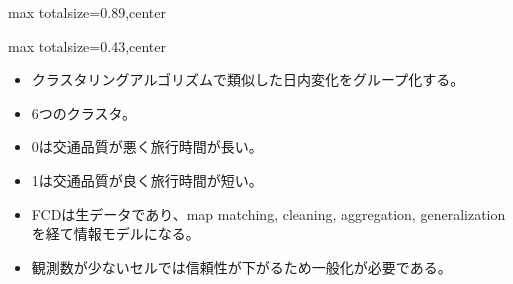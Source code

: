 \begin{minipage}[t]{0.58\textwidth}
\begin{adjustbox}{max totalsize={\textwidth}{0.89\textheight},center}
\begin{minipage}{\textwidth}
\end{minipage}
\end{adjustbox}
\end{minipage}


\clearpage
{}
\begin{minipage}[t]{0.405\textwidth}
\begin{adjustbox}{max totalsize={\textwidth}{0.43\textheight},center}
\begin{minipage}{\textwidth}\scriptsize
{}\begin{itemize}
\item クラスタリングアルゴリズムで類似した日内変化をグループ化する。
\item 6つのクラスタ。
\item 0は交通品質が悪く旅行時間が長い。
\item 1は交通品質が良く旅行時間が短い。
\end{itemize}\begin{itemize}
\item FCDは生データであり、map matching, cleaning, aggregation, generalization を経て情報モデルになる。
\item 観測数が少ないセルでは信頼性が下がるため一般化が必要である。
\end{itemize}
\end{minipage}
\end{adjustbox}
\end{minipage}\hfill
